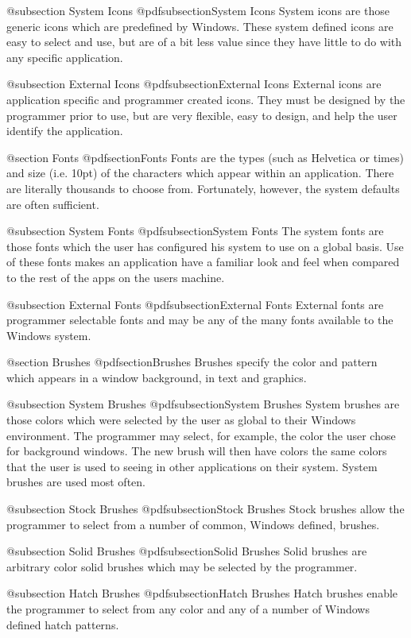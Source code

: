 @subsection System Icons
@pdfsubsection{System Icons}
System icons are those generic icons which are predefined by Windows.
These system defined icons are easy to select and use, but are of a bit
less value since they have little to do with any specific application.

@subsection External Icons
@pdfsubsection{External Icons}
External icons are application specific and programmer created icons.
They must be designed by the programmer prior to use, but are very
flexible, easy to design, and help the user identify the application.

@section Fonts
@pdfsection{Fonts}
Fonts are the types (such as Helvetica or times) and size (i.e. 10pt)
of the characters which appear within an application.  There are
literally thousands to choose from.  Fortunately, however, the system
defaults are often sufficient.

@subsection System Fonts
@pdfsubsection{System Fonts}
The system fonts are those fonts which the user has configured his
system to use on a global basis.  Use of these fonts makes an
application have a familiar look and feel when compared to the rest of
the apps on the users machine.

@subsection External Fonts
@pdfsubsection{External Fonts}
External fonts are programmer selectable fonts and may be any of the
many fonts available to the Windows system.

@section Brushes
@pdfsection{Brushes}
Brushes specify the color and pattern which appears in a window background,
in text and graphics.

@subsection System Brushes
@pdfsubsection{System Brushes}
System brushes are those colors which were selected by the user as
global to their Windows environment.  The programmer may select, for
example, the color the user chose for background windows.  The
new brush will then have colors the same colors that the user is used
to seeing in other applications on their system.  System brushes are
used most often.

@subsection Stock Brushes
@pdfsubsection{Stock Brushes}
Stock brushes allow the programmer to select from a number of common,
Windows defined, brushes.

@subsection Solid Brushes
@pdfsubsection{Solid Brushes}
Solid brushes are arbitrary color solid brushes which may be selected
by the programmer.

@subsection Hatch Brushes
@pdfsubsection{Hatch Brushes}
Hatch brushes enable the programmer to select from any color and any of
a number of Windows defined hatch patterns.

